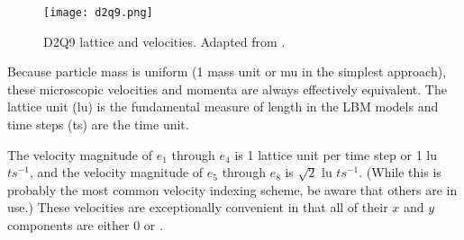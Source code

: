 \begin{figure}[t!]
	\centering
		\texttt{[image: d2q9.png]}
	\caption{D2Q9 lattice and velocities. Adapted from \citep{sukop2006lattice}.}
	\label{fig:d2q9}
\end{figure}

Because particle mass is uniform (1 mass unit or mu in the simplest approach), these microscopic velocities and momenta are always effectively equivalent. The lattice unit (lu) is the fundamental measure of length in the LBM models and time steps (ts) are the time unit. 

The velocity magnitude of $e_1$ through $e_4$ is 1 lattice unit per time step or 1 lu ${ts}^{-1}$, and the velocity magnitude of $e_5$ through $e_8$ is $\sqrt{2}$ lu ${ts}^{-1}$. (While this is probably the most common velocity indexing scheme, be aware that others are in use.) These velocities are exceptionally convenient in that all of their $x$ and $y$ components are either 0 or .
